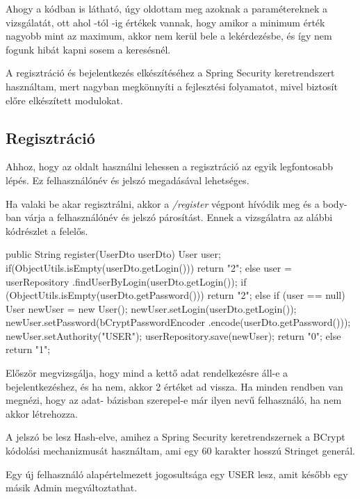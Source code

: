Ahogy a kódban is látható, úgy oldottam meg azoknak a paramétereknek a vizsgálatát, ott ahol -tól -ig értékek vannak, hogy amikor a minimum érték nagyobb mint az maximum, akkor nem kerül bele a lekérdezésbe, és így nem fogunk hibát kapni sosem a keresésnél.

A regisztráció és bejelentkezés elkészítéséhez a Spring Security keretrendszert \cite{SpringSecurity} használtam, mert nagyban megkönnyíti a fejlesztési folyamatot, mivel biztosít előre elkészített modulokat.

\subsection{Regisztráció}
Ahhoz, hogy az oldalt használni lehessen  a regisztráció az egyik legfontosabb lépés. Ez felhasználónév és  jelszó megadásával lehetséges. 

Ha valaki be akar regisztrálni, akkor a  \textit{/register} végpont hívódik meg és a body-ban várja a felhasználónév és jelszó párosítást. Ennek a vizsgálatra az alábbi kódrészlet a felelős.

\begin{java}
public String register(UserDto userDto) {
    User user;
    if(ObjectUtils.isEmpty(userDto.getLogin())) {
      return "2";
    } else {
        user = userRepository
          .findUserByLogin(userDto.getLogin());
    }
    if (ObjectUtils.isEmpty(userDto.getPassword())) {
      return "2";
    } else {
        if (user == null) {
           User newUser = new User();
           newUser.setLogin(userDto.getLogin());
           newUser.setPassword(bCryptPasswordEncoder
                      .encode(userDto.getPassword()));
           newUser.setAuthority("USER");
           userRepository.save(newUser); 
           return "0";
        } else {
           return "1";
        }
    }
}
\end{java}

Először megvizsgálja, hogy mind a kettő adat rendelkezésre áll-e a bejelentkezéshez, és ha nem, akkor 2 értéket ad vissza. Ha minden rendben van megnézi, hogy az adat-
bázisban szerepel-e már ilyen nevű felhasználó, ha nem akkor létrehozza.


A jelszó be lesz Hash-elve, amihez a Spring Security  keretrendszernek a BCrypt kódolási mechanizmusát használtam, ami egy 60 karakter hosszú Stringet generál.

Egy új felhasználó alapértelmezett jogosultsága egy USER lesz, amit később egy másik Admin megváltoztathat.

